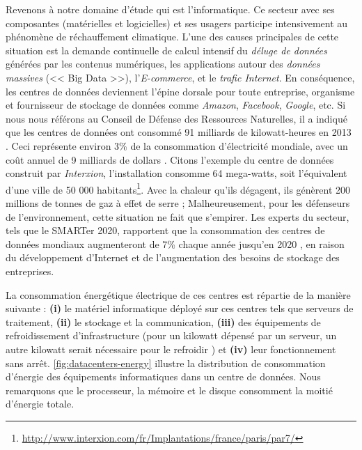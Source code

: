 Revenons à notre domaine d'étude qui est l'informatique. Ce secteur avec ses composantes (matérielles et logicielles) et ses usagers participe intensivement au phénomène de réchauffement climatique. L'une des causes principales de cette situation est la demande continuelle de calcul intensif du \textit{déluge de données} générées par les contenus numériques, les applications autour des \textit{données massives} (<< Big Data >>), l'\textit{E-commerce}, et le \textit{trafic Internet}. En conséquence, les centres de données deviennent l'épine dorsale pour toute entreprise, organisme et fournisseur de stockage de données comme \textit{Amazon}, \textit{Facebook}, \textit{Google}, etc. Si nous nous référons au Conseil de Défense des Ressources Naturelles, il a indiqué que les centres de données ont consommé 91 milliards de kilowatt-heures en 2013 \cite{NRDC14b}. Ceci représente environ 3\% de la consommation d'électricité mondiale, avec un coût annuel de 9 milliards de dollars \cite{Koomey11}. Citons l'exemple du centre de données construit par \textit{Interxion}, l'installation consomme 64 mega-watts, soit l'équivalent d'une ville de 50 000 habitants\footnote{\url{http://www.interxion.com/fr/Implantations/france/paris/par7/}}. Avec la chaleur qu'ils dégagent, ils génèrent 200 millions de tonnes de gaz à effet de serre \cite{NRDC14b}; Malheureusement, pour les défenseurs de l'environnement, cette situation ne fait que s'empirer. Les experts du secteur, tels que le SMARTer 2020, rapportent que la consommation des centres de données mondiaux augmenteront de 7\% chaque année jusqu'en 2020 \cite{SMARTer12}, en raison du développement d'Internet et de l'augmentation des besoins de stockage des entreprises.

La consommation énergétique électrique de ces centres est répartie de la manière suivante : \textbf{(i)} le matériel informatique déployé sur ces centres tels que serveurs de traitement, \textbf{(ii)} le stockage et la communication, \textbf{(iii)} des équipements de refroidissement d'infrastructure (pour un kilowatt dépensé par un serveur, un autre kilowatt serait nécessaire pour le refroidir \cite{Emerson07, Tsirogiannis10}) et \textbf{(iv)} leur fonctionnement sans arrêt. \ref{fig:datacenters-energy} illustre la distribution de consommation d'énergie des équipements informatiques dans un centre de données. Nous remarquons que le processeur, la mémoire et le disque consomment la moitié d'énergie totale.

